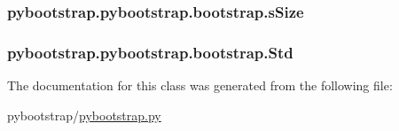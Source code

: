 \hypertarget{classpybootstrap_1_1pybootstrap_1_1bootstrap_ace79fbf110c7059374909d987a05d1c4}{
\subsubsection[{s\-Size}]{\setlength{\rightskip}{0pt plus 5cm}pybootstrap.\-pybootstrap.\-bootstrap.\-s\-Size}}\label{classpybootstrap_1_1pybootstrap_1_1bootstrap_ace79fbf110c7059374909d987a05d1c4}
\hypertarget{classpybootstrap_1_1pybootstrap_1_1bootstrap_a1ba773408de92cc8934a446a857b50c9}{
\subsubsection[{Std}]{\setlength{\rightskip}{0pt plus 5cm}pybootstrap.\-pybootstrap.\-bootstrap.\-Std}}\label{classpybootstrap_1_1pybootstrap_1_1bootstrap_a1ba773408de92cc8934a446a857b50c9}


The documentation for this class was generated from the following file\-:\begin{DoxyCompactItemize}
\item 
pybootstrap/\hyperlink{pybootstrap_8py}{pybootstrap.\-py}\end{DoxyCompactItemize}
